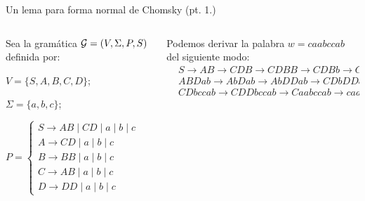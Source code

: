\documentclass[aspectratio=169, 11pt]{beamer}
\begin{document}
	\begin{frame}[fragile]{Un lema para forma normal de Chomsky (pt. 1.)}
		
		\begin{columns}
			
			\begin{column}{0.5\textwidth}
				Sea la gramática ${\cal G} = (V, \Sigma, P, S)$ definida por:
				
					 $V = \{ S,A,B,C,D \}$;

					 $\Sigma = \{ a,b,c \}$;
					 
						
						$P = \begin{cases}
								S \to AB \mid CD \mid a \mid b \mid c \\
								A \to CD \mid a \mid b \mid c	\\
								B \to BB \mid a \mid b \mid c	\\
								C \to AB \mid a \mid b \mid c	\\
								D \to DD \mid a \mid b \mid c
						\end{cases}$
						
				
			\end{column}

			\begin{column}{0.5 \textwidth}
				Podemos derivar la palabra $w = caabccab$ del siguiente modo:
				\begin{align*}
					&S \to AB \to CDB \to CDBB \to CDBb \to CDab \to \\
					&ABDab  \to  AbDab   \to AbDDab  \to CDbDDab   \to\\
					&CDbccab  \to CDDbccab \to Caabccab \to caabccab \\
				\end{align*}
			\end{column}
		\end{columns}
	\end{frame}
\end{document}
